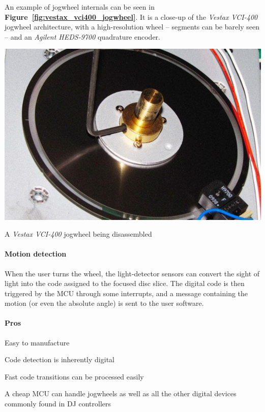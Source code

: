 \documentclass[a4paper,10pt]{article}
\makeatletter
\newenvironment{figurehere}{\def\@captype{figure}\vspace{2ex}}{\vspace{2ex}}
\makeatother
\begin{document}
\begin{multicols}{2}
An example of jogwheel internals can be seen in \textbf{Figure~\ref{fig:vestax_vci400_jogwheel}}.
It is a close-up of the \emph{Vestax VCI-400}\cite{vestax_vci400} jogwheel
architecture, with a high-resolution wheel -- segments can be barely seen --
and an \emph{Agilent HEDS-9700} quadrature encoder.

\begin{figurehere}
	\label{fig:vestax_vci400_jogwheel}
	\centering
	\includegraphics[keepaspectratio=true,width=0.8\columnwidth]{images/vestax_vci400_jogwheel.pdf}
	\caption{A \emph{Vestax VCI-400} jogwheel being disassembled}
\end{figurehere}


\paragraph{Motion detection}
When the user turns the wheel, the light-detector sensors can convert the
sight of light into the code assigned to the focused disc slice. The digital
code is then triggered by the MCU through some interrupts, and a message
containing the motion (or even the absolute angle) is sent to the user
software.

\paragraph{Pros}
\begin{itemize*}
	\item Easy to manufacture
	\item Code detection is inherently digital
	\item Fast code transitions can be processed easily
	\item A cheap MCU can handle jogwheels as well as all the other digital
		devices commonly found in DJ controllers
\end{itemize*}



\end{multicols}
\end{document}
